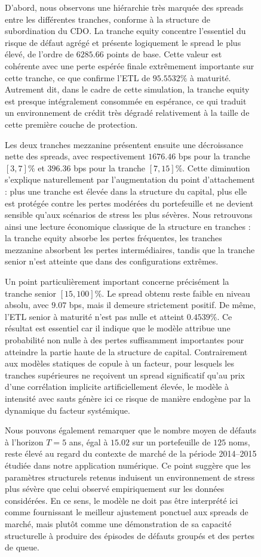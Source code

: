 \begin{figure}[H]
D'abord, nous observons une hiérarchie très marquée des spreads entre les différentes tranches, conforme à la structure de subordination du CDO. La tranche equity concentre l'essentiel du risque de défaut agrégé et présente logiquement le spread le plus élevé, de l'ordre de $6285.66$ points de base. Cette valeur est cohérente avec une perte espérée finale extrêmement importante sur cette tranche, ce que confirme l'ETL de $95.5532\%$ à maturité. Autrement dit, dans le cadre de cette simulation, la tranche equity est presque intégralement consommée en espérance, ce qui traduit un environnement de crédit très dégradé relativement à la taille de cette première couche de protection.

Les deux tranches mezzanine présentent ensuite une décroissance nette des spreads, avec respectivement $1676.46$ bps pour la tranche $[3,7]\%$ et $396.36$ bps pour la tranche $[7,15]\%$. Cette diminution s'explique naturellement par l'augmentation du point d'attachement : plus une tranche est élevée dans la structure du capital, plus elle est protégée contre les pertes modérées du portefeuille et ne devient sensible qu'aux scénarios de stress les plus sévères. Nous retrouvons ainsi une lecture économique classique de la structure en tranches : la tranche equity absorbe les pertes fréquentes, les tranches mezzanine absorbent les pertes intermédiaires, tandis que la tranche senior n'est atteinte que dans des configurations extrêmes.

Un point particulièrement important concerne précisément la tranche senior $[15,100]\%$. Le spread obtenu reste faible en niveau absolu, avec $9.07$ bps, mais il demeure strictement positif. De même, l'ETL senior à maturité n'est pas nulle et atteint $0.4539\%$. Ce résultat est essentiel car il indique que le modèle attribue une probabilité non nulle à des pertes suffisamment importantes pour atteindre la partie haute de la structure de capital. Contrairement aux modèles statiques de copule à un facteur, pour lesquels les tranches supérieures ne reçoivent un spread significatif qu'au prix d'une corrélation implicite artificiellement élevée, le modèle à intensité avec sauts génère ici ce risque de manière endogène par la dynamique du facteur systémique.

Nous pouvons également remarquer que le nombre moyen de défauts à l'horizon $T=5$ ans, égal à $15.02$ sur un portefeuille de $125$ noms, reste élevé au regard du contexte de marché de la période 2014--2015 étudiée dans notre application numérique. Ce point suggère que les paramètres structurels retenus induisent un environnement de stress plus sévère que celui observé empiriquement sur les données considérées. En ce sens, le modèle ne doit pas être interprété ici comme fournissant le meilleur ajustement ponctuel aux spreads de marché, mais plutôt comme une démonstration de sa capacité structurelle à produire des épisodes de défauts groupés et des pertes de queue. 


\end{figure}
